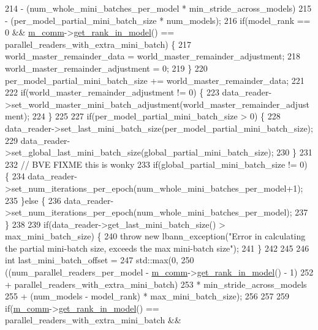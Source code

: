 \begin{DoxyCode}
214                                           - (num\_whole\_mini\_batches\_per\_model * min\_stride\_across\_models)
215                                           - (per\_model\_partial\_mini\_batch\_size * num\_models);
216   \textcolor{keywordflow}{if}(model\_rank == 0 && \hyperlink{classlbann_1_1generic__io__buffer_a2e4a46c85c8b30e10b1cc5acaa2c4cca}{m\_comm}->\hyperlink{classlbann_1_1lbann__comm_a789453454468a3b70de768537c50ca52}{get\_rank\_in\_model}() == 
      parallel\_readers\_with\_extra\_mini\_batch) \{
217     world\_master\_remainder\_data = world\_master\_remainder\_adjustment;
218     world\_master\_remainder\_adjustment = 0;
219   \}
220   per\_model\_partial\_mini\_batch\_size += world\_master\_remainder\_data;
221 
222   \textcolor{keywordflow}{if}(world\_master\_remainder\_adjustment != 0) \{
223     data\_reader->set\_world\_master\_mini\_batch\_adjustment(world\_master\_remainder\_adjustment);
224   \}
225 
227   \textcolor{keywordflow}{if}(per\_model\_partial\_mini\_batch\_size > 0) \{
228     data\_reader->set\_last\_mini\_batch\_size(per\_model\_partial\_mini\_batch\_size);
229     data\_reader->set\_global\_last\_mini\_batch\_size(global\_partial\_mini\_batch\_size);
230   \}
231 
232   \textcolor{comment}{// BVE FIXME this is wonky}
233   \textcolor{keywordflow}{if}(global\_partial\_mini\_batch\_size != 0) \{
234     data\_reader->set\_num\_iterations\_per\_epoch(num\_whole\_mini\_batches\_per\_model+1);
235   \}\textcolor{keywordflow}{else} \{
236     data\_reader->set\_num\_iterations\_per\_epoch(num\_whole\_mini\_batches\_per\_model);
237   \}
238 
239   \textcolor{keywordflow}{if}(data\_reader->get\_last\_mini\_batch\_size() > max\_mini\_batch\_size) \{
240     \textcolor{keywordflow}{throw} \textcolor{keyword}{new} lbann\_exception(\textcolor{stringliteral}{"Error in calculating the partial mini-batch size, exceeds the max mini-batch
       size"});
241   \}
242 
245 
246   \textcolor{keywordtype}{int} last\_mini\_batch\_offset =
247     std::max(0,
250              ((num\_parallel\_readers\_per\_model - \hyperlink{classlbann_1_1generic__io__buffer_a2e4a46c85c8b30e10b1cc5acaa2c4cca}{m\_comm}->\hyperlink{classlbann_1_1lbann__comm_a789453454468a3b70de768537c50ca52}{get\_rank\_in\_model}() - 1)
252               + parallel\_readers\_with\_extra\_mini\_batch)
253              * min\_stride\_across\_models
255              + (num\_models - model\_rank) * max\_mini\_batch\_size);
256 
257 
259   \textcolor{keywordflow}{if}(\hyperlink{classlbann_1_1generic__io__buffer_a2e4a46c85c8b30e10b1cc5acaa2c4cca}{m\_comm}->\hyperlink{classlbann_1_1lbann__comm_a789453454468a3b70de768537c50ca52}{get\_rank\_in\_model}() == parallel\_readers\_with\_extra\_mini\_batch && 

\end{DoxyCode}
